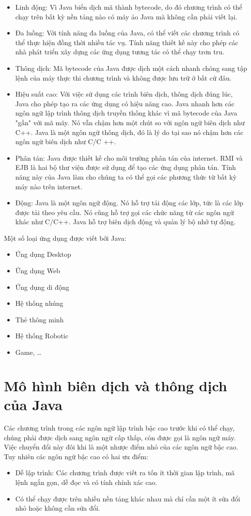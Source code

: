 \begin{itemize}
\item Linh động: Vì Java biển dịch mã thành bytecode, do đó chương trình có thể chạy trên bất kỳ nền tảng nào có máy ảo Java mà không cần phải viết lại.
\item Đa luồng: Với tính năng đa luồng của Java, có thể viết các chương trình có thể thực hiện đồng thời nhiều tác vụ. Tính năng thiết kế này cho phép các nhà phát triển xây dựng các ứng dụng tương tác có thể chạy trơn tru.
\item Thông dịch: Mã bytecode của Java được dịch một cách nhanh chóng sang tập lệnh của máy thực thi chương trình và không được lưu trữ ở bất cứ đâu.
\item Hiệu suất cao: Với việc sử dụng các trình biên dịch, thông dịch đúng lúc, Java cho phép tạo ra các ứng dụng có hiệu năng cao. Java nhanh hơn các ngôn ngữ lập trình thông dịch truyền thống khác vì mã bytecode của Java "gần" với mã mãy. Nó vẫn chậm hơn một chút so với ngôn ngữ biên dịch như C++. Java là một ngôn ngữ thông dịch, đó là lý do tại sao nó chậm hơn các ngôn ngữ biên dịch như C/C ++.
\item Phân tán: Java được thiết kế cho môi trường phân tán của internet. RMI và EJB là hai bộ thư viện được sử dụng để tạo các ứng dụng phân tán. Tính năng này của Java làm cho chúng ta có thể gọi các phương thức từ bất kỳ máy nào trên internet.
\item Động: Java là một ngôn ngữ động. Nó hỗ trợ tải động các lớp, tức là các lớp được tải theo yêu cầu. Nó cũng hỗ trợ gọi các chức năng từ các ngôn ngữ khác như C/C++. Java hỗ trợ biên dịch động và quản lý bộ nhớ tự động.
\end{itemize}
Một số loại ứng dụng được viết bởi Java:
\begin{itemize}
\item Ứng dụng Desktop
\item Ứng dụng Web
\item Ứng dụng di động
\item Hệ thống nhúng
\item Thẻ thông minh
\item Hệ thống Robotic
\item Game, …
\end{itemize}

\section{Mô hình biên dịch và thông dịch của Java}
\indent Các chương trình trong các ngôn ngữ lập trình bậc cao trước khi có thể chạy, chúng phải được dịch sang ngôn ngữ cấp thấp, còn được gọi là ngôn ngữ máy. Việc chuyển đổi này đôi khi là một nhược điểm nhỏ của các ngôn ngữ bậc cao. Tuy nhiên các ngôn ngữ bậc cao có hai ưu điểm:
\begin{itemize}
\item Dễ lập trình: Các chương trình được viết ra tốn ít thời gian lập trình, mã lệnh ngắn gọn, dễ đọc và có tính chính xác cao.
\item Có thể chạy được trên nhiều nền tảng khác nhau mà chỉ cần một ít sửa đổi nhỏ hoặc không cần sửa đổi. 
\end{itemize}

